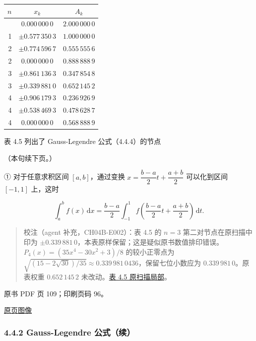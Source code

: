 {\def\LTcaptype{none} %
\begin{longtable}[]{@{}rcc@{}}
\toprule\noalign{}
\(n\) & \(x_k\) & \(A_k\) \\
\midrule\noalign{}
\endhead
\bottomrule\noalign{}
\endlastfoot
0 & \(0.000\,000\,0\) & \(2.000\,000\,0\) \\
1 & \(\pm0.577\,350\,3\) & \(1.000\,000\,0\) \\
2 & \(\pm0.774\,596\,7\) & \(0.555\,555\,6\) \\
2 & \(0.000\,000\,0\) & \(0.888\,888\,9\) \\
3 & \(\pm0.861\,136\,3\) & \(0.347\,854\,8\) \\
3 & \(\pm0.339\,881\,0\) & \(0.652\,145\,2\) \\
4 & \(\pm0.906\,179\,3\) & \(0.236\,926\,9\) \\
4 & \(\pm0.538\,469\,3\) & \(0.478\,628\,7\) \\
4 & \(0.000\,000\,0\) & \(0.568\,888\,9\) \\
\end{longtable}
}

表 4.5 列出了 Gauss-Legendre 公式（4.4.4）的节点

（本句续下页。）

① 对于任意求积区间 \([a,b]\)，通过变换 \(x=\dfrac{b-a}{2}t+\dfrac{a+b}{2}\) 可以化到区间 \([-1,1]\) 上，这时

\[
\int_a^b f(x)\,\mathrm{d}x
=\frac{b-a}{2}\int_{-1}^{1}f\left(\frac{b-a}{2}t+\frac{a+b}{2}\right)\,\mathrm{d}t.
\]

\begin{quote}
校注（agent 补充，CH04B-E002）：表 4.5 的 \(n=3\) 第二对节点在原扫描中印为 \(\pm0.339\,881\,0\)，本表原样保留；这是疑似原书数值排印错误。\(P_4(x)=(35x^4-30x^2+3)/8\) 的较小正零点为 \(\sqrt{(15-2\sqrt{30})/35}\approx0.339\,981\,0436\)，保留七位小数应为 \(0.339\,981\,0\)。原表权重 \(0.652\,145\,2\) 未改动。\href{verified/assets/ch04b/review-table-4-5.png}{表 4.5 原扫描局部}。
\end{quote}

\clearpage

原书 PDF 页 109；印刷页码 96。

\href{source-images/pdf-109.jpeg}{原页图像}

\subsubsection{4.4.2 Gauss-Legendre 公式（续）}\label{ch04b-gauss-legendre-ux516cux5f0fux7eed}

